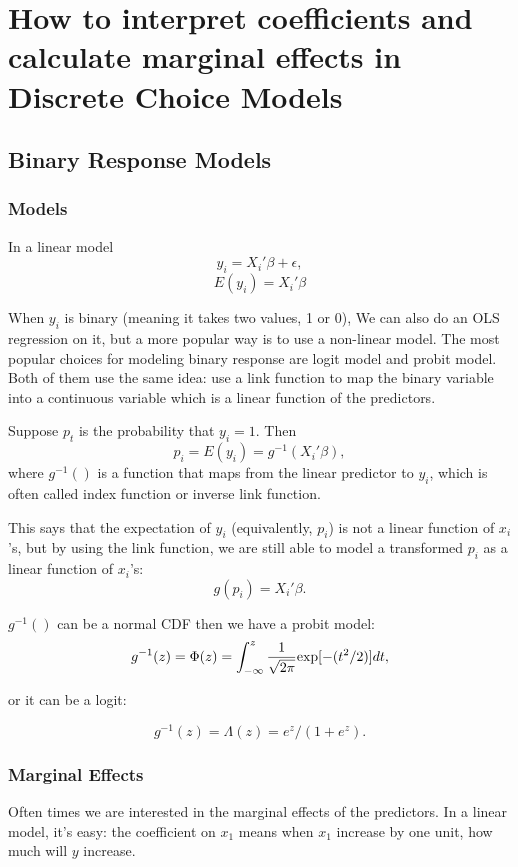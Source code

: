 \chapter{How to interpret coefficients and calculate marginal effects in Discrete Choice Models}

\section{Binary Response Models}

\subsection{Models}
In a linear model
\[ y_i= X_i' \beta + \epsilon, \]
\[E(y_i) = X_i' \beta \]


 When $y_i$ is binary (meaning it takes two values, 1 or 0), We can also do an OLS regression on it, but a more popular way is to use a non-linear model.  The most popular choices for modeling binary response are logit model and probit model.  Both of them use the same idea: use a link function to map the binary variable into a continuous variable which is a linear function of the predictors.

Suppose $p_t$ is the probability that $y_i=1$.  Then 
\[p_i=E(y_i) = g^{-1}(X_i' \beta), \]
where $g^{-1}()$ is a function that maps from the linear predictor to $y_i$, which is often called index function or inverse link function.

This says that the expectation of $y_i$ (equivalently, $p_i$) is not a linear function of $x_i$'s, but by using the link function, we are still able to model a transformed $p_i$ as a linear function of $x_i$'s:
\[g(p_i) = X_i' \beta. \]

$g^{-1}()$ can be a normal CDF then we have a probit model:
\[ g^{-1}(z) = \Phi (z) = \int_{- \infty}^z \frac{1}{\sqrt{2 \pi}} {\rm exp} [-(t^2/2)] dt, \]

or it can be a logit:

\[ g^{-1}(z) = \Lambda (z) =  e^z/(1+e^z). \]
 


\subsection{Marginal Effects}

Often times we are interested in the marginal effects of the predictors.  In a linear model, it's easy: the coefficient on $x_1$ means when $x_1$ increase by one unit, how much will $y$ increase.

